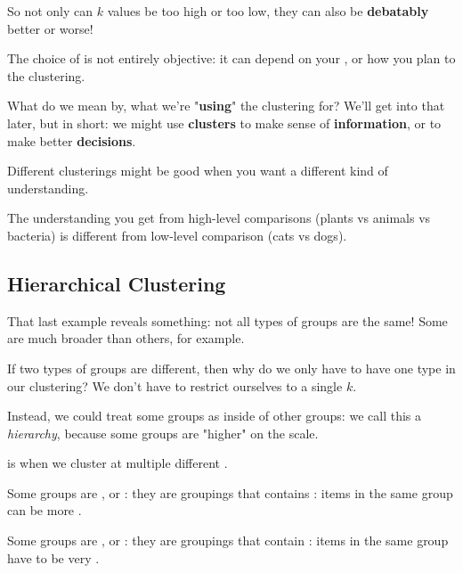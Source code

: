         So not only can $k$ values be too high or too low, they can also be \textbf{debatably} better or worse!
        
        \begin{concept}
            The  choice of  is not entirely objective: it can depend on your , or how you plan to  the clustering.
        \end{concept}
        
        What do we mean by, what we're "\textbf{using}" the clustering for? We'll get into that later, but in short: we might use \textbf{clusters} to make sense of \textbf{information}, or to make better \textbf{decisions}. 
        
        Different clusterings might be good when you want a different kind of understanding.
        
        \miniex The understanding you get from high-level comparisons (plants vs animals vs bacteria) is different from low-level comparison (cats vs dogs).
    
    \subsection{Hierarchical Clustering}
    
        That last example reveals something: not all types of groups are the same! Some are much broader than others, for example.
        
        If two types of groups are different, then why do we only have to have one type in our clustering? We don't have to restrict ourselves to a single $k$.
        
        Instead, we could treat some groups as inside of other groups: we call this a \textit{hierarchy}, because some groups are "higher" on the scale.\\
        
        \begin{definition}
             is when we cluster at multiple different . 
            
            Some groups are , or : they are groupings that contains : items in the same group can be more .
            
            Some groups are , or : they are groupings that contain : items in the same group have to be very .
        \end{definition}
        
